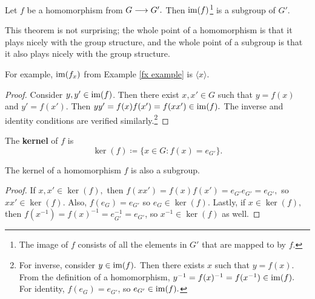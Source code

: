 \begin{theorem}
Let $f$ be a homomorphism from $G \longrightarrow G'.$ Then $\operatorname{im}(f)$\footnote{The image of $f$ consists of all the elements in $G'$ that are mapped to by $f.$} is a subgroup of $G'.$
\end{theorem}

This theorem is not surprising; the whole point of a homomorphism is that it plays nicely with the group structure, and the whole point of a subgroup is that it also plays nicely with the group structure.
\begin{example}
For example, $\operatorname{im}(f_x)$ from Example \ref{fx example} is $\langle x \rangle.$
\end{example}

\begin{proof}
Consider $y, y' \in \operatorname{im}(f)$. Then there exist $x, x'\in G$ such that $y = f(x)$ and $y' = f(x').$ Then $yy' = f(x)f(x') = f(xx') \in \operatorname{im}(f).$ The inverse and identity conditions are verified similarly.\footnote{For inverse, consider $y \in \operatorname{im}(f).$ Then there exists $x$ such that $y = f(x).$ From the definition of a homomorphism, $y^{-1} = f(x)^{-1} = f(x^{-1}) \in \operatorname{im}(f).$ For identity, $f(e_G) = e_{G'}$, so $e_{G'} \in \operatorname{im}(f).$}
\end{proof}

\begin{definition}
The \textbf{kernel} of $f$ is \[\ker(f) \coloneqq \{x \in G: f(x) = e_{G'}\}.\]


\end{definition}

\begin{theorem}
The kernel of a homomorphism $f$ is also a subgroup.
\end{theorem}
\begin{proof}
If $x, x' \in \ker(f),$ then $f(xx') = f(x)f(x') = e_{G'}e_{G'} = e_{G'},$ so $xx' \in \ker(f)$. Also, $f(e_G) = e_{G'}$ so $e_G \in \ker(f).$ Lastly, if $x \in \ker(f),$ then $f(x^{-1}) =f(x)^{-1} = e_{G'}^{-1} = e_{G'}$, so $x^{-1} \in \ker(f)$ as well.
\end{proof}

